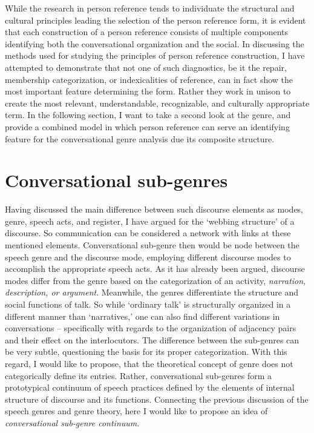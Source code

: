\documentclass[12pt]{article}
\begin{document}
While the research in person reference tends to individuate the structural and cultural principles leading the selection of the person reference form, it is evident that each construction of a person reference consists of multiple components identifying both the conversational organization and the social. In discussing the methods used for studying the principles of person reference construction, I have attempted to demonstrate that not one of such diagnostics, be it the repair, membership categorization, or indexicalities of reference, can in fact show the most important feature determining the form. Rather they work in unison to create the most relevant, understandable, recognizable, and culturally appropriate term. In the following section, I want to take a second look at the genre, and provide a combined model in which person reference can serve an identifying feature for the conversational genre analysis due its composite structure. 
\section{Conversational sub-genres}
Having discussed the main difference between  such discourse elements as modes, genre, speech acts, and register, I have argued for the `webbing structure' of a discourse. So communication can be considered a network with links at these mentioned elements. Conversational sub-genre then would be  node  between the speech genre and the discourse mode, employing different discourse modes to accomplish the appropriate speech acts. As it has already been argued, discourse modes differ from the genre based on the categorization of an activity, \textit{narration, description, or argument}. Meanwhile, the genres differentiate the structure and social functions of talk. So while `ordinary talk' is structurally organized in a different manner than `narratives,' one can also find different variations in conversations -- specifically with regards to the organization of adjacency pairs and their effect on the interlocutors. The difference between the sub-genres can be very subtle, questioning the basis for its proper categorization. With this regard, I would like to propose, that the theoretical concept of genre does not categorically define its entries. Rather, conversational sub-genres form a prototypical continuum of speech practices defined by the elements of internal structure of discourse and its functions. 
Connecting the previous discussion of the speech genres and genre theory, here I would like to propose an idea of \textit{conversational sub-genre continuum}. 
\end{document}
